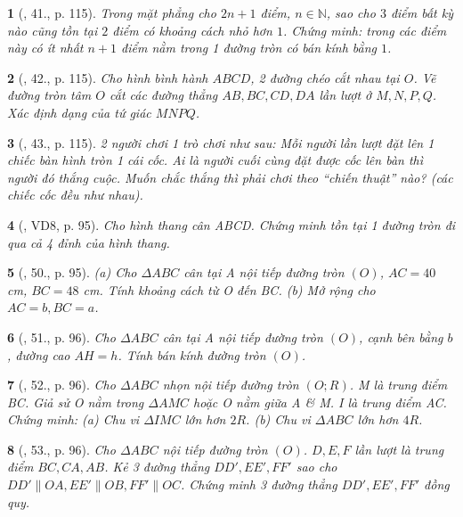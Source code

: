 \documentclass{article}
\newtheorem{baitoan}{}
\begin{document}
\begin{baitoan}[\cite{Tuyen_Toan_9_old}, 41., p. 115]
	Trong mặt phẳng cho $2n + 1$ điểm, $n\in\mathbb{N}$, sao cho $3$ điểm bất kỳ nào cũng tồn tại $2$ điểm có khoảng cách nhỏ hơn $1$. Chứng minh: trong các điểm này có ít nhất $n + 1$ điểm nằm trong 1 đường tròn có bán kính bằng $1$.
\end{baitoan}

\begin{baitoan}[\cite{Tuyen_Toan_9_old}, 42., p. 115]
	Cho hình bình hành $ABCD$, 2 đường chéo cắt nhau tại $O$. Vẽ đường tròn tâm $O$ cắt các đường thẳng $AB,BC,CD,DA$ lần lượt ở $M,N,P,Q$. Xác định dạng của tứ giác $MNPQ$.
\end{baitoan}

\begin{baitoan}[\cite{Tuyen_Toan_9_old}, 43., p. 115]
	2 người chơi 1 trò chơi như sau: Mỗi người lần lượt đặt lên 1 chiếc bàn hình tròn 1 cái cốc. Ai là người cuối cùng đặt được cốc lên bàn thì người đó thắng cuộc. Muốn chắc thắng thì phải chơi theo ``chiến thuật'' nào? (các chiếc cốc đều như nhau).
\end{baitoan}

\begin{baitoan}[\cite{Binh_Toan_9_tap_1}, VD8, p. 95]
	Cho hình thang cân ABCD. Chứng minh tồn tại 1 đường tròn đi qua cả 4 đỉnh của hình thang.
\end{baitoan}

\begin{baitoan}[\cite{Binh_Toan_9_tap_1}, 50., p. 95]
	(a) Cho $\Delta ABC$ cân tại A nội tiếp đường tròn $(O)$, $AC = 40$ {\rm cm}, $BC = 48$ {\rm cm}. Tính khoảng cách từ O đến BC. (b) Mở rộng cho $AC = b,BC = a$.
\end{baitoan}

\begin{baitoan}[\cite{Binh_Toan_9_tap_1}, 51., p. 96]
	Cho $\Delta ABC$ cân tại A nội tiếp đường tròn $(O)$, cạnh bên bằng $b$, đường cao $AH = h$. Tính bán kính đường tròn $(O)$.
\end{baitoan}

\begin{baitoan}[\cite{Binh_Toan_9_tap_1}, 52., p. 96]
	Cho $\Delta ABC$ nhọn nội tiếp đường tròn $(O;R)$. M là trung điểm BC. Giả sử O nằm trong $\Delta AMC$ hoặc O nằm giữa A \& M. I là trung điểm AC. Chứng minh: (a) Chu vi $\Delta IMC$ lớn hơn $2R$. (b) Chu vi $\Delta ABC$ lớn hơn $4R$.
\end{baitoan}

\begin{baitoan}[\cite{Binh_Toan_9_tap_1}, 53., p. 96]
	Cho $\Delta ABC$ nội tiếp đường tròn $(O)$. $D,E,F$ lần lượt là trung điểm $BC,CA,AB$. Kẻ 3 đường thẳng $DD',EE',FF'$ sao cho $DD'\parallel OA,EE'\parallel OB,FF'\parallel OC$. Chứng minh 3 đường thẳng $DD',EE',FF'$ đồng quy.
\end{baitoan}
\end{document}
